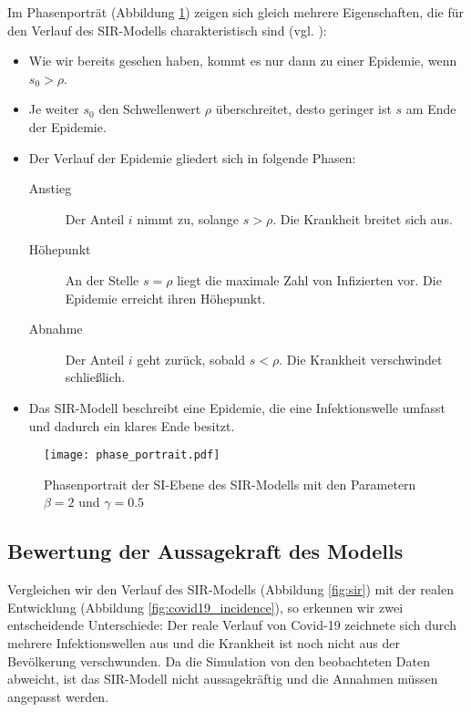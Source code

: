 \documentclass[../main.tex]{subfiles}
\begin{document}
        Im Phasenporträt (Abbildung \ref{fig:phase_portrait}) zeigen sich gleich mehrere Eigenschaften, die für den Verlauf des SIR-Modells charakteristisch sind (vgl. \cite[S. 39, 41, 45]{Li18}):
        \begin{itemize}
            \item Wie wir bereits gesehen haben, kommt es nur dann zu einer Epidemie, wenn $s_0 > \rho$.
            \item Je weiter $s_0$ den Schwellenwert $\rho$ überschreitet, desto geringer ist $s$ am Ende der Epidemie.
            \item Der Verlauf der Epidemie gliedert sich in folgende Phasen:
            \begin{description}
                \item[Anstieg] Der Anteil $i$ nimmt zu, solange $s > \rho$. Die Krankheit breitet sich aus.
                \item[Höhepunkt] An der Stelle $s = \rho$ liegt die maximale Zahl von Infizierten vor. Die Epidemie erreicht ihren Höhepunkt.
                \item[Abnahme] Der Anteil $i$ geht zurück, sobald $s < \rho$. Die Krankheit verschwindet schließlich.
            \end{description}
            \item Das SIR-Modell beschreibt eine Epidemie, die eine Infektionswelle umfasst und dadurch ein klares Ende besitzt.
        \end{itemize}

        \begin{figure}[h]
            \centering
            \texttt{[image: phase\_portrait.pdf]}
            \caption[Phasenportrait des SIR-Modells]{Phasenportrait der SI-Ebene des SIR-Modells mit den Parametern $\beta=2$ und $\gamma=0.5$}
            \label{fig:phase_portrait}
        \end{figure}

    \subsection{Bewertung der Aussagekraft des Modells}
    Vergleichen wir den Verlauf des SIR-Modells (Abbildung \ref{fig:sir}) mit der realen Entwicklung (Abbildung \ref{fig:covid19_incidence}), so erkennen wir zwei entscheidende Unterschiede:
    Der reale Verlauf von Covid-19 zeichnete sich durch mehrere Infektionswellen aus und die Krankheit ist noch nicht aus der Bevölkerung verschwunden.
    Da die Simulation von den beobachteten Daten abweicht, ist das SIR-Modell nicht aussagekräftig und die Annahmen müssen angepasst werden.
\end{document}
